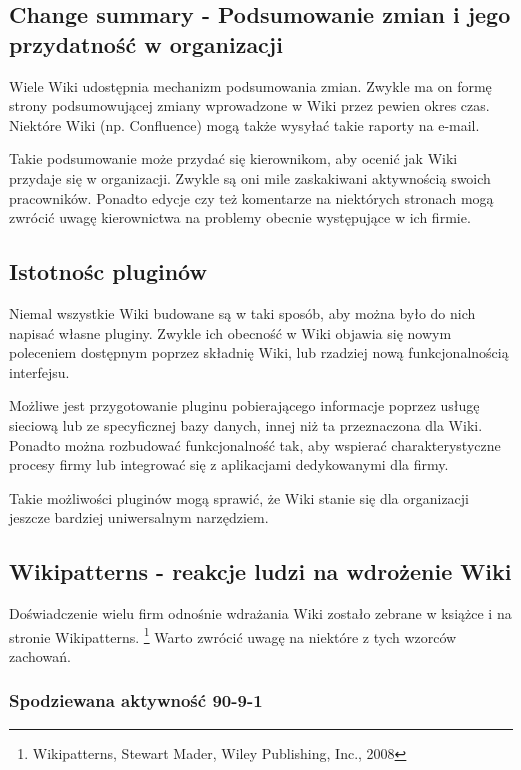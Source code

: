 \documentclass{article}
\begin{document}
	\subsection{Change summary - Podsumowanie zmian i  jego przydatność w organizacji}
	
	Wiele Wiki udostępnia mechanizm podsumowania zmian. Zwykle ma on formę strony podsumowującej zmiany wprowadzone w Wiki przez pewien okres czas. Niektóre Wiki (np. Confluence) mogą także wysyłać takie raporty na e-mail. 

	Takie podsumowanie może przydać się kierownikom, aby ocenić jak Wiki przydaje się w organizacji. Zwykle są oni mile zaskakiwani aktywnością swoich pracowników. Ponadto edycje czy też komentarze na niektórych stronach mogą zwrócić uwagę kierownictwa na problemy obecnie występujące w ich firmie. 

	\subsection{Istotnośc pluginów}

	Niemal wszystkie Wiki budowane są w taki sposób, aby można było do nich napisać własne pluginy. Zwykle ich obecność w Wiki objawia się nowym poleceniem dostępnym poprzez składnię Wiki, lub rzadziej nową funkcjonalnością interfejsu. 

Możliwe jest przygotowanie pluginu pobierającego informacje poprzez usługę sieciową lub ze specyficznej bazy danych, innej niż ta przeznaczona dla Wiki. Ponadto można rozbudować funkcjonalność tak, aby wspierać charakterystyczne procesy firmy lub integrować się z aplikacjami dedykowanymi dla firmy. 

Takie możliwości pluginów mogą sprawić, że Wiki stanie się dla organizacji jeszcze bardziej uniwersalnym narzędziem. 

\subsection{Wikipatterns - reakcje ludzi na wdrożenie Wiki}

Doświadczenie wielu firm odnośnie wdrażania Wiki zostało zebrane w książce i na stronie Wikipatterns. \footnote{Wikipatterns, Stewart Mader, Wiley Publishing, Inc., 2008} Warto zwrócić uwagę na niektóre z tych wzorców zachowań.


\subsubsection{Spodziewana aktywność 90-9-1}
\end{document}

